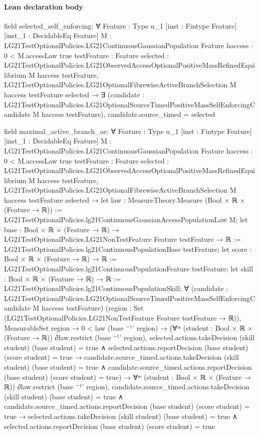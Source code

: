 \documentclass[10pt]{article}
\begin{document}
\paragraph{Lean declaration body}
\begin{ReviewVerbatim}
field selected_self_enforcing:
∀ {Feature : Type u_1} [inst : Fintype Feature] [inst_1 : DecidableEq Feature]
  {M : LG21TestOptionalPolicies.LG21ContinuousGaussianPopulation Feature} {haccess : 0 < M.accessLaw {true}}
  {testFeature : Feature}
  {selected : LG21TestOptionalPolicies.LG21ObservedAccessOptionalPositiveMassRefinedEquilibrium M haccess testFeature},
  LG21TestOptionalPolicies.LG21OptionalFibrewiseActiveBranchSelection M haccess testFeature selected →
    ∃ (candidate :
      LG21TestOptionalPolicies.LG21OptionalSourceTimedPositiveMassSelfEnforcingCandidate M haccess testFeature),
      candidate.source_timed = selected

field maximal_active_branch_ae:
∀ {Feature : Type u_1} [inst : Fintype Feature] [inst_1 : DecidableEq Feature]
  {M : LG21TestOptionalPolicies.LG21ContinuousGaussianPopulation Feature} {haccess : 0 < M.accessLaw {true}}
  {testFeature : Feature}
  {selected : LG21TestOptionalPolicies.LG21ObservedAccessOptionalPositiveMassRefinedEquilibrium M haccess testFeature},
  LG21TestOptionalPolicies.LG21OptionalFibrewiseActiveBranchSelection M haccess testFeature selected →
    let law : MeasureTheory.Measure (Bool × ℝ × (Feature → ℝ)) :=
      LG21TestOptionalPolicies.lg21ContinuousGaussianAccessPopulationLaw M;
    let base : Bool × ℝ × (Feature → ℝ) → LG21TestOptionalPolicies.LG21NonTestFeature Feature testFeature → ℝ :=
      LG21TestOptionalPolicies.lg21ContinuousPopulationBase testFeature;
    let score : Bool × ℝ × (Feature → ℝ) → ℝ := LG21TestOptionalPolicies.lg21ContinuousPopulationFeature testFeature;
    let skill : Bool × ℝ × (Feature → ℝ) → ℝ := LG21TestOptionalPolicies.lg21ContinuousPopulationSkill;
    ∀
      (candidate :
        LG21TestOptionalPolicies.LG21OptionalSourceTimedPositiveMassSelfEnforcingCandidate M haccess testFeature)
      (region : Set (LG21TestOptionalPolicies.LG21NonTestFeature Feature testFeature → ℝ)),
      MeasurableSet region →
        0 < law (base ⁻¹' region) →
          (∀ᵐ (student : Bool × ℝ × (Feature → ℝ)) ∂law.restrict (base ⁻¹' region),
              selected.actions.takeDecision (skill student) (base student) = true ∧
                  selected.actions.reportDecision (base student) (score student) = true →
                candidate.source_timed.actions.takeDecision (skill student) (base student) = true ∧
                  candidate.source_timed.actions.reportDecision (base student) (score student) = true) →
            ∀ᵐ (student : Bool × ℝ × (Feature → ℝ)) ∂law.restrict (base ⁻¹' region),
              candidate.source_timed.actions.takeDecision (skill student) (base student) = true ∧
                  candidate.source_timed.actions.reportDecision (base student) (score student) = true →
                selected.actions.takeDecision (skill student) (base student) = true ∧
                  selected.actions.reportDecision (base student) (score student) = true
\end{ReviewVerbatim}
\end{document}
